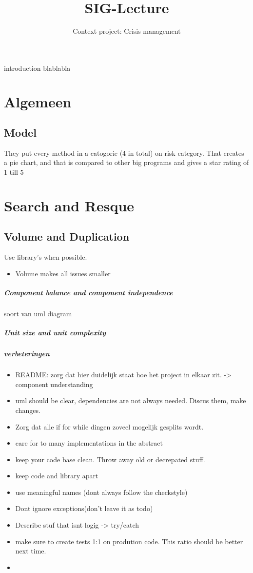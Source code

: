 \documentclass{article}
\begin{document}
\title{SIG-Lecture}
\author{Context project: Crisis management}

\maketitle
introduction blablabla 
\section*{Algemeen}
	\subsection*{Model}
	They put every method in a catogorie (4 in total) on risk category. That creates a pie chart, and that is compared to other big programs and gives a star rating of 1 till 5 
\section*{Search and Resque}
	\subsection*{Volume and Duplication}
	Use library's when possible. 
	\begin{itemize}
		\item Volume makes all issues smaller
	\end{itemize}
	\subparagraph*{Component balance and component independence}
	soort van uml diagram 
	\subparagraph*{Unit size and unit complexity}
	
	\subparagraph{verbeteringen}
	\begin{itemize}
		\item README: zorg dat hier duidelijk staat hoe het project in elkaar zit. -> component understanding 
		\item uml should  be clear, dependencies are not always needed. Discus them, make changes. 
		\item Zorg dat alle if for while dingen zoveel mogelijk gesplits wordt. 
		\item care for to many implementations in the abstract 
		\item keep your code base clean. Throw away old or decrepated stuff.
		\item keep code and library apart
		\item use meaningful names (dont always follow the checkstyle)
		\item Dont ignore exceptions(don't leave it as todo) 
		\item Describe stuf that isnt logig -> try/catch 
		\item make sure to create tests 1:1 on prodution code. This ratio should be better next time. 
		\item 
	\end{itemize}
\end{document}

